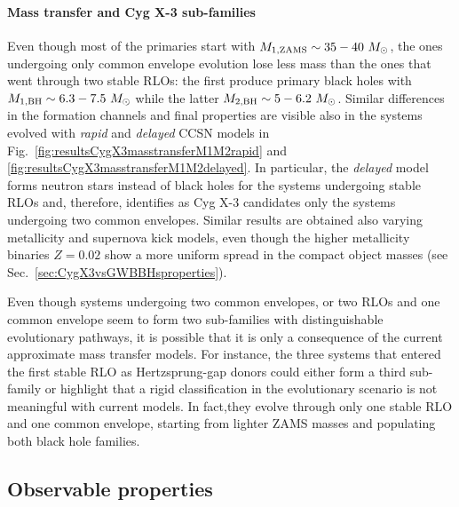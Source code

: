 \documentclass[a4paper,titlepage]{book}     	%
\newcommand{\sun}{\ensuremath{_\odot}}
\newcommand{\msun}{\ensuremath{M\sun}}
\begin{document}
\paragraph{Mass transfer and Cyg X-3 sub-families} Even though most of the primaries start with $M_{\rm 1,ZAMS} \sim 35-40~\msun$, the ones undergoing only common envelope evolution lose less mass than the ones that went through two stable RLOs: the first produce primary black holes with $M_{\rm 1, BH} \sim 6.3-7.5~\msun$ while the latter $M_{\rm 2, BH} \sim 5-6.2~\msun$. Similar differences in the formation channels and final properties are visible also in the systems evolved with \emph{rapid} and \emph{delayed} CCSN models in Fig.\ \ref{fig:resultsCygX3masstransferM1M2rapid} and \ref{fig:resultsCygX3masstransferM1M2delayed}. In particular, the \emph{delayed} model forms neutron stars instead of black holes for the systems undergoing stable RLOs and, therefore, identifies as Cyg X-3 candidates only the systems undergoing two common envelopes. Similar results are obtained also varying metallicity and supernova kick models, even though the higher metallicity binaries $Z=0.02$ show a more uniform spread in the compact object masses (see Sec.\ \ref{sec:CygX3vsGWBBHsproperties}).

Even though systems undergoing two common envelopes, or two RLOs and one common envelope seem to form two sub-families with distinguishable evolutionary pathways, it is possible that it is only a consequence of the current approximate mass transfer models. For instance, the three systems that entered the first stable RLO as Hertzsprung-gap donors could either form a third sub-family or highlight that a rigid classification in the evolutionary scenario is not meaningful with current models. In fact,they evolve through only one stable RLO and one common envelope, starting from lighter ZAMS masses and populating both black hole families.




\subsection{Observable properties}\label{subsec:CygX3}
\end{document}
